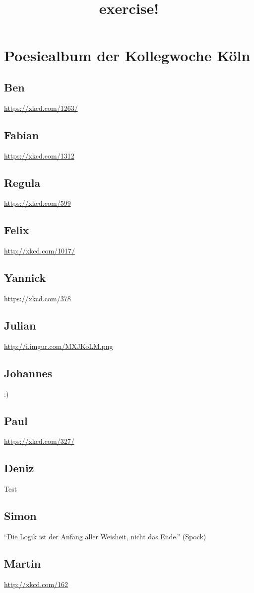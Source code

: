 \documentclass[12pt]{scrartcl}
\begin{document}
\title{exercise!}
\maketitle
\section{Poesiealbum der Kollegwoche Köln}
\subsection{Ben}
\url{https://xkcd.com/1263/}
\subsection{Fabian}
\url{https://xkcd.com/1312}
\subsection{Regula}
\url{https://xkcd.com/599}
\subsection{Felix}
\url{http://xkcd.com/1017/}
\subsection{Yannick}
\url{https://xkcd.com/378}
\subsection{Julian}
\url{http://i.imgur.com/MXJKoLM.png}
\subsection{Johannes}
:)
\subsection{Paul}
\url{https://xkcd.com/327/}

\subsection{Deniz}
Test

\subsection{Simon}
``Die Logik ist der Anfang aller Weisheit, nicht das Ende.'' (Spock)
\subsection{Martin}
\url{http://xkcd.com/162}
\end{document}

